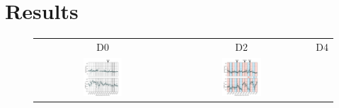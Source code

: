 \documentclass[10pt,a4paper]{article}
\begin{document}
\section{Results}

\newcommand{\behwidth}{0.3}
\begin{figure}
\centering
\begin{tabular}{ccc}
	D0 & D2  & D4 \\
	\includegraphics[width=\behwidth\textwidth]{figures/behavioral/d0_scores_copyDraw}&
	\includegraphics[width=\behwidth\textwidth]{figures/behavioral/d2_scores_copyDraw}&

\end{tabular}
\end{figure}
\end{document}
